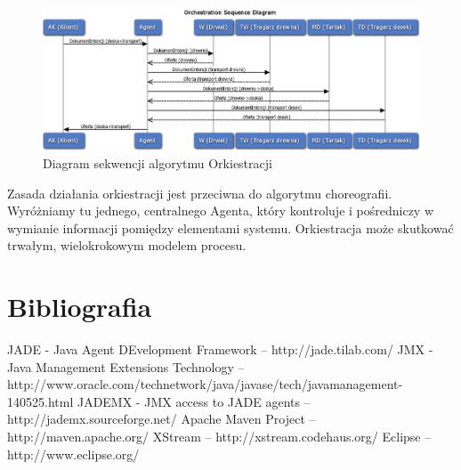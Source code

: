 \documentclass[a4paper,12pt]{article}
\begin{document}
\begin{figure}[!h]
\begin{center}
\includegraphics[scale=0.6]{gfx/PlatformaWymianyDobr-img12.png}
\caption{Diagram sekwencji algorytmu Orkiestracji}
\label{orchestration}
\end{center}
\end{figure}

Zasada działania orkiestracji jest przeciwna do algorytmu choreografii. Wyróżniamy tu jednego, centralnego Agenta, który kontroluje i pośredniczy w wymianie informacji pomiędzy elementami systemu. Orkiestracja może skutkować trwałym, wielokrokowym modelem procesu.

\newpage

\section{Bibliografia}

\begin{thebibliography}{1}
 JADE - Java Agent DEvelopment Framework -- http://jade.tilab.com/
 JMX - Java Management Extensions Technology -- http://www.oracle.com/technetwork/java/javase/tech/javamanagement-140525.html
 JADEMX - JMX access to JADE agents -- http://jademx.sourceforge.net/
 Apache Maven Project -- http://maven.apache.org/
 XStream -- http://xstream.codehaus.org/
 Eclipse -- http://www.eclipse.org/
\end{thebibliography}
\end{document}
